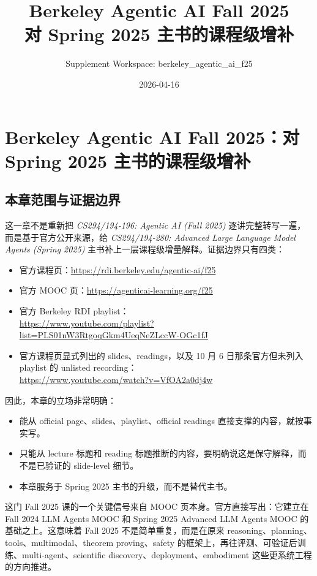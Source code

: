 \documentclass[11pt]{ctexbook}
\title{Berkeley Agentic AI Fall 2025\\对 Spring 2025 主书的课程级增补}
\author{Supplement Workspace: berkeley\_agentic\_ai\_f25}
\date{2026-04-16}
\begin{document}
\maketitle
\tableofcontents

\chapter{Berkeley Agentic AI Fall 2025：对 Spring 2025 主书的课程级增补}
\label{chap:berkeley_agentic_ai_f25_extension}

\section{本章范围与证据边界}

这一章不是重新把 \emph{CS294/194-196: Agentic AI (Fall 2025)} 逐讲完整转写一遍，而是基于官方公开来源，给 \emph{CS294/194-280: Advanced Large Language Model Agents (Spring 2025)} 主书补上一层课程级增量解释。证据边界只有四类：

\begin{itemize}
\item 官方课程页：\url{https://rdi.berkeley.edu/agentic-ai/f25}
\item 官方 MOOC 页：\url{https://agenticai-learning.org/f25}
\item 官方 Berkeley RDI playlist：\\ \url{https://www.youtube.com/playlist?list=PLS01nW3RtgoqGkm4UeqNeZLccW-OGc1fJ}
\item 官方课程页显式列出的 slides、readings，以及 10 月 6 日那条官方但未列入 playlist 的 unlisted recording：\\ \url{https://www.youtube.com/watch?v=VfOA2a0dj4w}
\end{itemize}

因此，本章的立场非常明确：

\begin{itemize}
\item 能从 official page、slides、playlist、official readings 直接支撑的内容，就按事实写。
\item 只能从 lecture 标题和 reading 标题推断的内容，要明确说这是保守解释，而不是已验证的 slide-level 细节。
\item 本章服务于 Spring 2025 主书的升级，而不是替代主书。
\end{itemize}

这门 Fall 2025 课的一个关键信号来自 MOOC 页本身。官方直接写出：它建立在 Fall 2024 LLM Agents MOOC 和 Spring 2025 Advanced LLM Agents MOOC 的基础之上。这意味着 Fall 2025 不是简单重复，而是在原来 reasoning、planning、tools、multimodal、theorem proving、safety 的框架上，再往评测、可验证后训练、multi-agent、scientific discovery、deployment、embodiment 这些更系统工程的方向推进。
\end{document}
